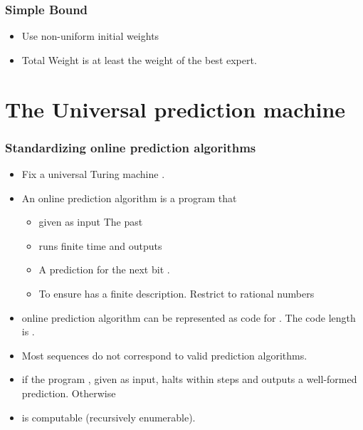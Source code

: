 \documentclass[handout]{beamer}
\begin{document}
\begin{frame}
\frametitle{Simple Bound}
\begin{itemize}
\item Use non-uniform initial weights 
\item Total Weight is at least the weight of the best expert.
\end{itemize}
\end{frame}

\section{The Universal prediction machine}

\begin{frame}
\frametitle{Standardizing online prediction algorithms}
\begin{itemize}
\item Fix a universal Turing machine .
\item An online prediction algorithm  is a program that 
\begin{itemize}
\item
given as input {\color{blue} The past} 
\item runs finite time and outputs
\item
A prediction for the next bit .
\item 
To ensure  has a finite description. Restrict to {\color{blue}rational} numbers 
\end{itemize}

\item {} online prediction algorithm can be represented as code 
for . The code length is .
\item Most sequences do not correspond to valid prediction algorithms. 
\item 
{} if the program \R{$\vb$}, given \R{$\X$} as input, 
halts within  steps and outputs a well-formed prediction. Otherwise 
\item {} is computable (recursively enumerable).
\end{itemize}
\end{frame}
\end{document}

